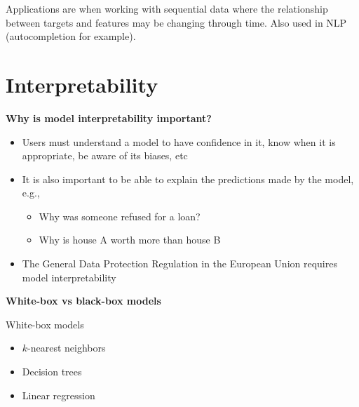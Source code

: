 Applications are when working with sequential data where the relationship between targets and features may be changing through time. Also used in NLP (autocompletion for example).





\section{Interpretability}

\textbf{Why is model interpretability important?}
\begin{itemize}
    \item Users must understand a model to have confidence in it, know when it is appropriate, be aware of its biases, etc
    \item It is also important to be able to explain the predictions made by the model, e.g.,
          \begin{itemize}
              \item Why was someone refused for a loan?
              \item Why is house A worth more than house B
          \end{itemize}
    \item The General Data Protection Regulation in the European Union requires model interpretability
\end{itemize}

\textbf{White-box vs black-box models}

White-box models
\begin{itemize}
    \item $k$-nearest neighbors
    \item Decision trees
    \item Linear regression
\end{itemize}

